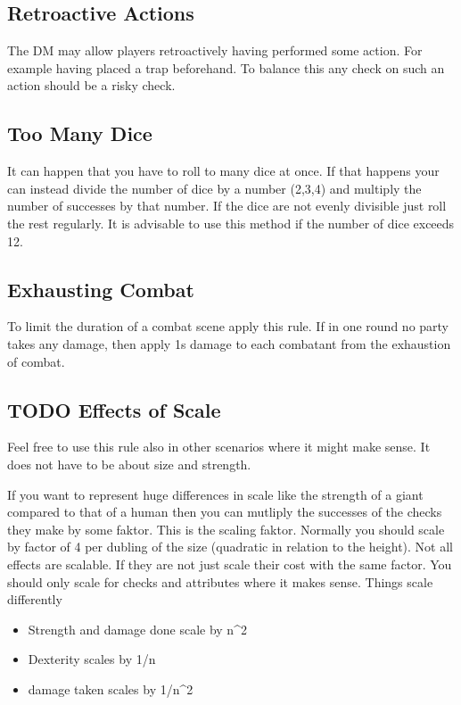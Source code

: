 \documentclass[11pt]{article}
\begin{document}
{\begin{multicols}{2}[]
\subsection{Retroactive Actions}
\label{sec:orgcf9331f}
The DM may allow players retroactively having performed some action. For example having placed a trap beforehand. To balance this any check on such an action should be a risky check.

\subsection{Too Many Dice}
\label{sec:org885f490}
It can happen that you have to roll to many dice at once. If that happens your can instead divide the number of dice by a number (2,3,4) and multiply the number of successes by that number. If the dice are not evenly divisible just roll the rest regularly. It is advisable to use this method if the number of dice exceeds 12.

\subsection{Exhausting Combat}
\label{sec:orgf08757b}
To limit the duration of a combat scene apply this rule. If in one round no party takes any damage, then apply 1s damage to each combatant from the exhaustion of combat. 

\subsection{{\bfseries\sffamily TODO} Effects of Scale}
\label{sec:org45e812e}

Feel free to use this rule also in other scenarios where it might make sense. It does not have to be about size and strength.

If you want to represent huge differences in scale like the strength of a giant compared to that of a human then you can mutliply the successes of the checks they make by some faktor. This is the scaling faktor. Normally you should scale by factor of 4 per dubling of the size (quadratic in relation to the height). Not all effects are scalable. If they are not just scale their cost with the same factor. You should only scale for checks and attributes where it makes sense.
Things scale differently
\begin{itemize}
\item Strength and damage done scale by n\^{}2
\item Dexterity scales by 1/n
\item damage taken scales by 1/n\^{}2
\end{itemize}



\end{multicols}}
\end{document}
